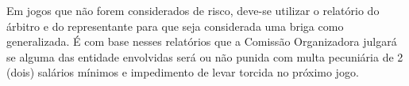 \begin{article}
	Em jogos que não forem considerados de risco, deve-se utilizar o relatório do árbitro e do representante para que seja considerada uma briga como generalizada. É com base nesses relatórios que a Comissão Organizadora julgará se alguma das entidade envolvidas será ou não punida com multa pecuniária de 2 (dois) salários mínimos e impedimento de levar torcida no próximo jogo.
\end{article}
